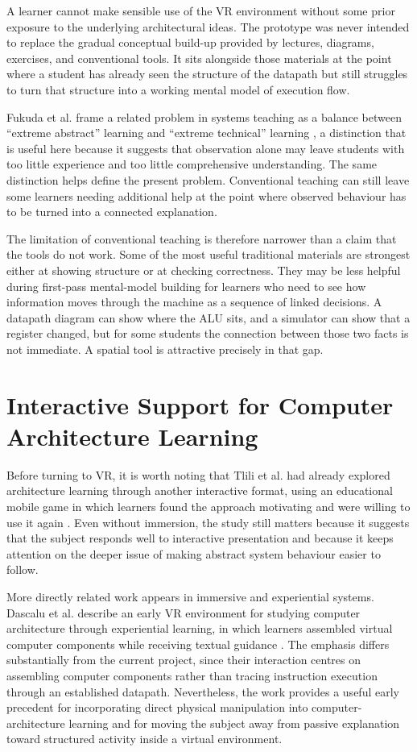 A learner cannot make sensible use of the VR environment without some prior exposure to the underlying architectural ideas. The prototype was never intended to replace the gradual conceptual build-up provided by lectures, diagrams, exercises, and conventional tools. It sits alongside those materials at the point where a student has already seen the structure of the datapath but still struggles to turn that structure into a working mental model of execution flow.

Fukuda et al. frame a related problem in systems teaching as a balance between ``extreme abstract'' learning and ``extreme technical'' learning \cite{fukuda2020practical}, a distinction that is useful here because it suggests that observation alone may leave students with too little experience and too little comprehensive understanding. The same distinction helps define the present problem. Conventional teaching can still leave some learners needing additional help at the point where observed behaviour has to be turned into a connected explanation.

The limitation of conventional teaching is therefore narrower than a claim that the tools do not work. Some of the most useful traditional materials are strongest either at showing structure or at checking correctness. They may be less helpful during first-pass mental-model building for learners who need to see how information moves through the machine as a sequence of linked decisions. A datapath diagram can show where the ALU sits, and a simulator can show that a register changed, but for some students the connection between those two facts is not immediate. A spatial tool is attractive precisely in that gap.

\section{Interactive Support for Computer Architecture Learning}

Before turning to VR, it is worth noting that Tlili et al. had already explored architecture learning through another interactive format, using an educational mobile game in which learners found the approach motivating and were willing to use it again \cite{tlili2016improving}. Even without immersion, the study still matters because it suggests that the subject responds well to interactive presentation and because it keeps attention on the deeper issue of making abstract system behaviour easier to follow.

More directly related work appears in immersive and experiential systems. Dascalu et al. describe an early VR environment for studying computer architecture through experiential learning, in which learners assembled virtual computer components while receiving textual guidance \cite{dascalu2017experiential}. The emphasis differs substantially from the current project, since their interaction centres on assembling computer components rather than tracing instruction execution through an established datapath. Nevertheless, the work provides a useful early precedent for incorporating direct physical manipulation into computer-architecture learning and for moving the subject away from passive explanation toward structured activity inside a virtual environment.

